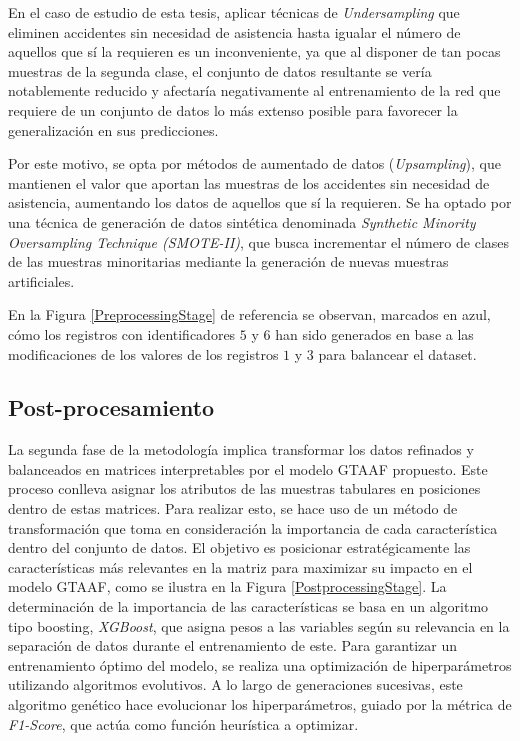 En el caso de estudio de esta tesis, aplicar técnicas de \textit{Undersampling} que eliminen accidentes sin necesidad de asistencia hasta igualar el número de aquellos que sí la requieren es un inconveniente, ya que al disponer de tan pocas muestras de la segunda clase, el conjunto de datos resultante se vería notablemente reducido y afectaría negativamente al entrenamiento de la red que requiere de un conjunto de datos lo más extenso posible para favorecer la generalización en sus predicciones.

Por este motivo, se opta por métodos de aumentado de datos (\textit{Upsampling}), que mantienen el valor que aportan las muestras de los accidentes sin necesidad de asistencia, aumentando los datos de aquellos que sí la requieren. Se ha optado por una técnica de generación de datos sintética denominada \textit{Synthetic Minority Oversampling Technique (SMOTE-II)}, que busca incrementar el número de clases de las muestras minoritarias mediante la generación de nuevas muestras artificiales.

En la Figura \ref{PreprocessingStage} de referencia se observan, marcados en azul, cómo los registros con identificadores $5$ y $6$ han sido generados en base a las modificaciones de los valores de los registros $1$ y $3$ para balancear el dataset.



\subsection{Post-procesamiento}

La segunda fase de la metodología implica transformar los datos refinados y balanceados en matrices interpretables por el modelo GTAAF propuesto. Este proceso conlleva asignar los atributos de las muestras tabulares en posiciones dentro de estas matrices. Para realizar esto, se hace uso de un método de transformación que toma en consideración la importancia de cada característica dentro del conjunto de datos. El objetivo es posicionar estratégicamente las características más relevantes en la matriz para maximizar su impacto en el modelo GTAAF, como se ilustra en la Figura \ref{PostprocessingStage}. La determinación de la importancia de las características se basa en un algoritmo tipo boosting, \textit{XGBoost}, que asigna pesos a las variables según su relevancia en la separación de datos durante el entrenamiento de este. Para garantizar un entrenamiento óptimo del modelo, se realiza una optimización de hiperparámetros utilizando algoritmos evolutivos. A lo largo de generaciones sucesivas, este algoritmo genético hace evolucionar los hiperparámetros, guiado por la métrica de \textit{F1-Score}, que actúa como función heurística a optimizar.


